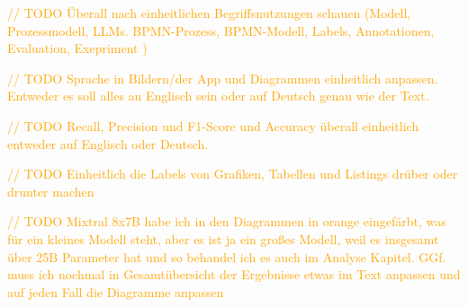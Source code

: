 \textcolor{orange}{// TODO Überall nach einheitlichen Begriffsnutzungen schauen (Modell, Prozessmodell, LLMs. BPMN-Prozess, BPMN-Modell, Labels, Annotationen, Evaluation, Exepriment )}

\textcolor{orange}{// TODO Sprache in Bildern/der App und Diagrammen einheitlich anpassen. Entweder es soll alles au Englisch sein oder auf Deutsch genau wie der Text.}

\textcolor{orange}{// TODO Recall, Precision und F1-Score und Accuracy überall einheitlich entweder auf Englisch oder Deutsch.}

\textcolor{orange}{// TODO Einheitlich die Labels von Grafiken, Tabellen und Listings drüber oder drunter machen}

\textcolor{orange}{// TODO Mixtral 8x7B habe ich in den Diagrammen in orange eingefärbt, was für ein kleines Modell steht, aber es ist ja ein großes Modell, weil es insgesamt über 25B Parameter hat und so behandel ich es auch im Analyse Kapitel. GGf. muss ich nochmal in Gesamtübersicht der Ergebnisse etwas im Text anpassen und auf jeden Fall die Diagramme anpassen}













